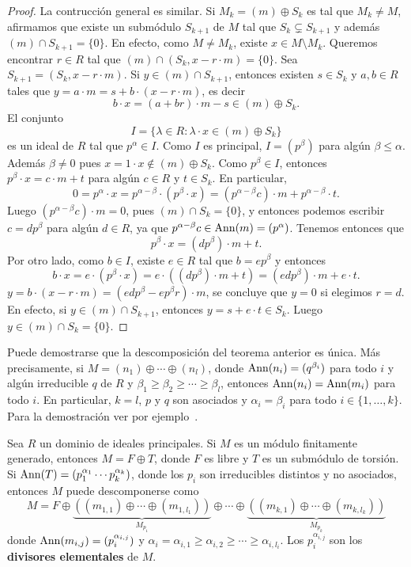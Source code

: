 \begin{proof}
	La contrucción general es similar. Si $M_k=(m)\oplus S_k$ es tal que $M_k\ne M$, afirmamos que existe un submódulo $S_{k+1}$ de $M$ tal que
	$S_k\subsetneq S_{k+1}$ y además $(m)\cap S_{k+1}=\{0\}$. En efecto, como $M\ne M_k$, existe $x\in M\setminus M_k$. 
	Queremos encontrar $r\in R$ tal que  $(m)\cap (S_k,x-r\cdot m)=\{0\}$. Sea 
	$S_{k+1}=(S_k,x-r\cdot m)$. Si $y\in (m)\cap S_{k+1}$, entonces existen $s\in S_k$ y $a,b\in R$ tales que   
	$y=a\cdot m=s+b\cdot (x-r\cdot m)$, es decir 
	\[
	b\cdot x=(a+br)\cdot m-s\in (m)\oplus S_k.
	\]
	El conjunto 
	\[
	I=\{\lambda\in R:\lambda\cdot x\in (m)\oplus S_k\}
	\]
	es un ideal de $R$ tal que $p^{\alpha}\in I$. Como
	$I$ es principal, $I=(p^\beta)$ para algún $\beta\leq\alpha$. Además $\beta\ne0$ pues $x=1\cdot x\not\in (m)\oplus S_k$. Como $p^\beta\in I$, entonces
	$p^\beta\cdot x=c\cdot m+t$ para algún $c\in R$ y $t\in S_k$. En particular, 
	\[
	0=p^{\alpha}\cdot x=p^{\alpha-\beta}\cdot (p^\beta \cdot x)=(p^{\alpha-\beta}c)\cdot m+p^{\alpha-\beta}\cdot t.
	\]
	Luego $(p^{\alpha-\beta} c)\cdot m=0$, pues 
	$(m)\cap S_k=\{0\}$, y entonces podemos escribir 
	$c=dp^\beta$ para algún $d\in R$, ya que  
	$p^{\alpha-\beta}c\in\operatorname{Ann}(m)=(p^{\alpha})$. Tenemos entonces que
	\[
	p^\beta\cdot x=(dp^\beta)\cdot m+t.
	\]
	Por otro lado, como $b\in I$, existe $e\in R$ tal que $b=ep^\beta$ y entonces
	\[
	b\cdot x=e\cdot (p^\beta\cdot x)=e\cdot((dp^\beta)\cdot m+t)=(edp^\beta)\cdot m+e\cdot t.
	\]
	$y=b\cdot (x-r\cdot m)=(edp^\beta-ep^\beta r)\cdot m$, se concluye que $y=0$ si elegimos 
	$r=d$. En efecto, si $y\in (m)\cap S_{k+1}$, entonces $y=s+e\cdot t\in S_k$. Luego 
	$y\in (m)\cap S_k=\{0\}$.
\end{proof}

Puede demostrarse que la descomposición del teorema anterior es única. Más precisamente, 
si $M=(n_1)\oplus\cdots\oplus (n_l)$, donde $\operatorname{Ann}(n_i)=(q^{\beta_i})$ para todo $i$ y algún irreducible $q$ de $R$ 
y $\beta_1\geq\beta_2\geq\cdots\geq\beta_l$, entonces $\operatorname{Ann}(n_i)=\operatorname{Ann}(m_i)$ para todo $i$. En particular, $k=l$, 
$p$ y $q$ son asociados y $\alpha_i=\beta_i$ para todo $i\in\{1,\dots,k\}$. 
Para la demostración ver 
por ejemplo~\cite[Theorem 6.11]{MR2344656}.

%
\begin{corollary}
Sea $R$ un dominio de ideales principales. Si $M$ es un módulo finitamente generado, entonces
$M=F\oplus T$, donde $F$ es libre y $T$ es un submódulo de torsión. Si $\operatorname{Ann}(T)=(p_1^{\alpha_1}\cdots p_k^{\alpha_k})$, donde
los $p_i$ son irreducibles distintos y no asociados, entonces 
$M$ puede descomponerse como
\[
M=F\oplus \underbrace{\left( (m_{1,1})\oplus\cdots\oplus (m_{1,l_1})\right)}_{M_{p_1}}\oplus\cdots\oplus 
\underbrace{\left( (m_{k,1})\oplus\cdots\oplus (m_{k,l_k})\right)}_{M_{p_k}}
\]
donde $\operatorname{Ann}(m_{i,j})=(p_i^{\alpha_{i,j}})$ y $\alpha_i=\alpha_{i,1}\geq\alpha_{i,2}\geq\cdots\geq \alpha_{i,l_i}$. Los $p_i^{\alpha_{i,j}}$ son 
los \textbf{divisores elementales} de $M$. 
\end{corollary}

